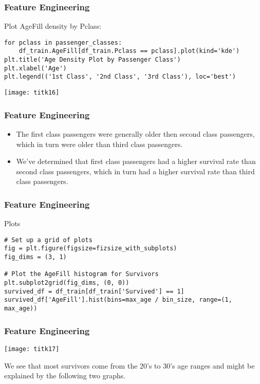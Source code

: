 \begin{frame}[fragile]\frametitle{Feature Engineering}
Plot AgeFill density by Pclass:
\begin{lstlisting}
for pclass in passenger_classes:
    df_train.AgeFill[df_train.Pclass == pclass].plot(kind='kde')
plt.title('Age Density Plot by Passenger Class')
plt.xlabel('Age')
plt.legend(('1st Class', '2nd Class', '3rd Class'), loc='best')
\end{lstlisting}
\begin{center}
\texttt{[image: titk16]}
\end{center}
\end{frame}


\begin{frame}[fragile]\frametitle{Feature Engineering}
\begin{itemize}
\item The first class passengers were generally older then second class passengers, which in turn were older than third class passengers. 
\item We've determined that first class passengers had a higher survival rate than second class passengers, which in turn had a higher survival rate than third class passengers.
\end{itemize}
\end{frame}

\begin{frame}[fragile]\frametitle{Feature Engineering}
Plots
\begin{lstlisting}
# Set up a grid of plots
fig = plt.figure(figsize=fizsize_with_subplots) 
fig_dims = (3, 1)

# Plot the AgeFill histogram for Survivors
plt.subplot2grid(fig_dims, (0, 0))
survived_df = df_train[df_train['Survived'] == 1]
survived_df['AgeFill'].hist(bins=max_age / bin_size, range=(1, max_age))
\end{lstlisting}
\end{frame}

\begin{frame}[fragile]\frametitle{Feature Engineering}
\begin{center}
\texttt{[image: titk17]}
\end{center}
We see that most survivors come from the 20's to 30's age ranges and might be explained by the following two graphs. 
\end{frame}


